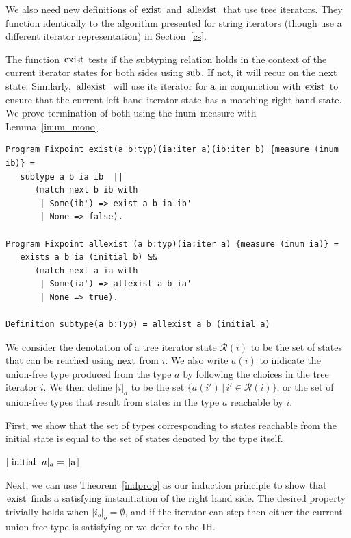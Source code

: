 \documentclass[a4paper,english]{lipics-v2019}
\newcommand{\denotes}[1]{\llbracket #1 \rrbracket}
\renewcommand{\c}[1]{\ensuremath{\text{\lstinline{#1}}}\xspace}
\begin{document}
We also need new definitions of \c{exist} and \c{allexist} that use tree iterators. They
function identically to the algorithm presented for string iterators (though use a different
iterator representation) in Section~\ref{cs}.

The function \c{exist} tests if the subtyping relation holds in the context of
the current iterator states for both sides using \c{sub}. If not, it will
recur on the next state. Similarly, \c{allexist} will use its iterator for \c
a in conjunction with \c{exist} to ensure that the current left hand iterator
state has a matching right hand state. We prove termination of both using the
\c{inum} measure with Lemma~\ref{inum_mono}.

\begin{lstlisting}
Program Fixpoint exist(a b:typ)(ia:iter a)(ib:iter b) {measure (inum ib)} =
   subtype a b ia ib  || 
      (match next b ib with 
       | Some(ib') => exist a b ia ib' 
       | None => false).

Program Fixpoint allexist (a b:typ)(ia:iter a) {measure (inum ia)} =
   exists a b ia (initial b) && 
      (match next a ia with 
       | Some(ia') => allexist a b ia' 
       | None => true).

Definition subtype(a b:Typ) = allexist a b (initial a)
\end{lstlisting}

\newcommand{\irdn}[1]{\ensuremath{\mathcal{R}({#1})}}
\newcommand{\irch}[2]{\ensuremath{|#1|_{#2}}}

We consider the denotation of a tree iterator state $\irdn{i}$ to be the set
of states that can be reached using \c{next} from $i$. We also write $a(i)$
to indicate the union-free type produced from the type $a$ by following the
choices in the tree iterator $i$. We then define \irch{i}{a} to be the set
$\{a(i')\,|\,i'\in\irdn{i}\}$, or the set of union-free types that result
from states in the type $a$ reachable by $i$.

First, we show that the set of types corresponding to states reachable from
the initial state is equal to the  set of states denoted by the type itself.

\begin{lemma}\label{triter_eq}
$\irch{\c{initial}~a}{a} = \denotes{\c a}$    
\end{lemma}

Next, we can use Theorem~\ref{indprop} as our induction principle to show that
\c{exist} finds a satisfying instantiation of the right hand side. The desired
property trivially holds when $\irch{i_b}{b} = \emptyset$, and if the iterator can
step then either the current union-free type is satisfying or we defer to the
IH.
\end{document}
